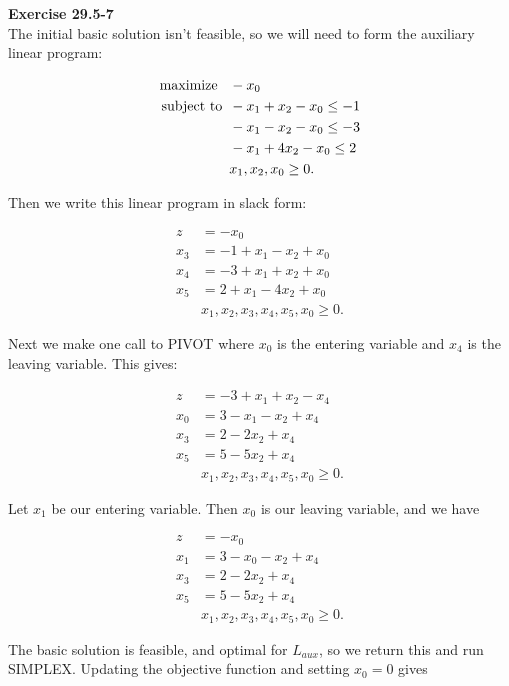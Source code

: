 \documentclass{article}
\begin{document}
\noindent\textbf{Exercise 29.5-7}\\

The initial basic solution isn't feasible, so we will need to form the auxiliary linear program:

\begin{align*}
\mbox{maximize \,\,\,} & -x_0\\
\mbox{subject to \,} & -x_1 + x_2 - x_0 \leq -1 \\
& -x_1 - x_2 - x_0 \leq -3 \\
& -x_1 + 4x_2 - x_0 \leq 2 \\
& x_1,x_2,x_0 \geq 0.
\end{align*}

Then we write this linear program in slack form:

\begin{align*}
z &= -x_0\\
x_3 &=-1 +x_1 - x_2 + x_0 \\
x_4&= -3 + x_1 + x_2 + x_0 \\
x_5 &= 2 + x_1 - 4x_2 + x_0\\
& x_1,x_2,x_3,x_4,x_5,x_0 \geq 0.
\end{align*}

Next we make one call to PIVOT where $x_0$ is the entering variable and $x_4$ is the leaving variable. This gives:

\begin{align*}
z &= -3 + x_1 + x_2 - x_4\\
x_0 &= 3 - x_1 - x_2 + x_4 \\
x_3 &= 2 - 2x_2 + x_4 \\
x_5 &= 5 - 5x_2 + x_4\\
& x_1,x_2,x_3,x_4,x_5,x_0 \geq 0.
\end{align*}

Let $x_1$ be our entering variable.  Then $x_0$ is our leaving variable, and we have

\begin{align*}
z &= -x_0\\
x_1 &= 3 - x_0 - x_2 + x_4 \\
x_3 &= 2 - 2x_2 + x_4 \\
x_5 &= 5 - 5x_2 + x_4\\
& x_1,x_2,x_3,x_4,x_5,x_0 \geq 0.
\end{align*}

The basic solution is feasible, and optimal for $L_{aux}$, so we return this and run SIMPLEX.  Updating the objective function and setting $x_0 = 0$ gives
\end{document}
